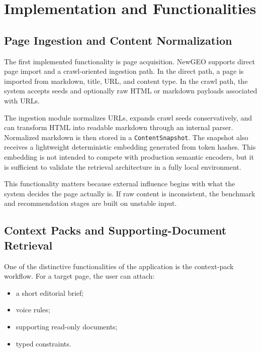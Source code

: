 
\chapter{Implementation and Functionalities}\label{chapter:implementation}

\section{Page Ingestion and Content Normalization}

The first implemented functionality is page acquisition. NewGEO supports direct page import
and a crawl-oriented ingestion path. In the direct path, a page is imported from markdown,
title, URL, and content type. In the crawl path, the system accepts seeds and optionally raw
HTML or markdown payloads associated with URLs.

The ingestion module normalizes URLs, expands crawl seeds conservatively, and can transform
HTML into readable markdown through an internal parser. Normalized markdown is then stored
in a \texttt{ContentSnapshot}. The snapshot also receives a lightweight deterministic embedding
generated from token hashes. This embedding is not intended to compete with production
semantic encoders, but it is sufficient to validate the retrieval architecture in a fully local
environment.

This functionality matters because external influence begins with what the system decides the
page actually is. If raw content is inconsistent, the benchmark and recommendation stages are
built on unstable input.

\section{Context Packs and Supporting-Document Retrieval}

One of the distinctive functionalities of the application is the context-pack workflow. For a
target page, the user can attach:
\begin{itemize}
    \item a short editorial brief;
    \item voice rules;
    \item supporting read-only documents;
    \item typed constraints.
\end{itemize}


